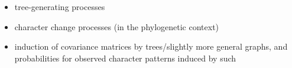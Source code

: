 \begin{itemize}
\begin{itemize}
 \item tree-generating processes

 \item character change processes (in the phylogenetic context)

 \item induction of covariance matrices by trees/slightly more general graphs, and probabilities for observed character patterns induced by such
 \end{itemize}

\end{itemize}


